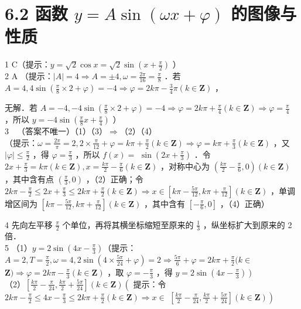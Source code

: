 \documentclass[10pt]{article}
\begin{document}
\section*{6.2 函数 \(y=A \sin (\omega x+\varphi)\) 的图像与性质}
1 C（提示：\(y=\sqrt{2} \cos x=\sqrt{2} \sin \left(x+\frac{\pi}{2}\right)\) ）\\
2 A （提示：\(|A|=4 \Rightarrow A= \pm 4, \omega=\frac{2 \pi}{16}=\frac{\pi}{8}\) ．若 \(A=4,4 \sin \left(\frac{\pi}{8} \times 2+\varphi\right)=-4 \Rightarrow \varphi=2 k \pi-\frac{3}{4} \pi(k \in \mathbf{Z})\) ，

无解．若 \(A=-4,-4 \sin \left(\frac{\pi}{8} \times 2+\varphi\right)=-4 \Rightarrow \varphi=2 k \pi+\frac{\pi}{4}(k \in \mathbf{Z}) \Rightarrow \varphi=\frac{\pi}{4}\) ，所以 \(y=-4 \sin \left(\frac{\pi}{8} x+\frac{\pi}{4}\right)\) ）\\
\(3 \quad\)（答案不唯一）（1）（3）\(\Rightarrow\)（2）（4）\\
（提示：\(\omega=\frac{2 \pi}{\pi}=2,2 \times \frac{\pi}{12}+\varphi=k \pi+\frac{\pi}{2}(k \in \mathbf{Z}) \Rightarrow \varphi=k \pi+\frac{\pi}{3}(k \in \mathbf{Z})\) ，又 \(|\varphi| \leqslant \frac{\pi}{2}\) ，得 \(\varphi=\frac{\pi}{3}\) ，所以 \(f(x)=\) \(\sin \left(2 x+\frac{\pi}{3}\right)\) ．令 \(2 x+\frac{\pi}{3}=k \pi(k \in \mathbf{Z}), x=\frac{k \pi}{2}-\frac{\pi}{6}(k \in \mathbf{Z})\) ，对称中心为 \(\left(\frac{k \pi}{2}-\frac{\pi}{6}, 0\right)(k \in \mathbf{Z})\) ，其中含有点 \(\left(\frac{\pi}{3}, 0\right)\) ，（2）正确；令 \(2 k \pi-\frac{\pi}{2} \leqslant 2 x+\frac{\pi}{3} \leqslant 2 k \pi+\frac{\pi}{2}(k \in \mathbf{Z}) \Rightarrow x \in\left[k \pi-\frac{5 \pi}{12}, k \pi+\frac{\pi}{12}\right](k \in \mathbf{Z})\) ，单调增区间为 \(\left[k \pi-\frac{5 \pi}{12}, k \pi+\frac{\pi}{12}\right](k \in \mathbf{Z})\) ，其中含有 \(\left[-\frac{\pi}{6}, 0\right]\) ，（4）正确）

4 先向左平移 \(\frac{\pi}{2}\) 个单位，再将其横坐标缩短至原来的 \(\frac{1}{3}\) ，纵坐标扩大到原来的 2 倍．\\
5 （1）\(y=2 \sin \left(4 x-\frac{\pi}{3}\right)\)（提示：\(A=2, T=\frac{\pi}{2}, \omega=4,2 \sin \left(4 \times \frac{5 \pi}{24}+\varphi\right)=2 \Rightarrow \frac{5 \pi}{6}+\varphi=2 k \pi+\frac{\pi}{2}(k \in\) \(\mathbf{Z}) \Rightarrow \varphi=2 k \pi-\frac{\pi}{3}(k \in \mathbf{Z})\) ，取 \(\varphi=-\frac{\pi}{3}\) ，得 \(\left.y=2 \sin \left(4 x-\frac{\pi}{3}\right)\right)\)\\
（2）\(\left[\frac{k \pi}{2}-\frac{\pi}{24}, \frac{k \pi}{2}+\frac{5 \pi}{24}\right](k \in \mathbf{Z})\left(\right.\) 提示：令 \(2 k \pi-\frac{\pi}{2} \leqslant 4 x-\frac{\pi}{3} \leqslant 2 k \pi+\frac{\pi}{2}(k \in \mathbf{Z}) \Rightarrow x \in\) \(\left.\left[\frac{k \pi}{2}-\frac{\pi}{24}, \frac{k \pi}{2}+\frac{5 \pi}{24}\right](k \in \mathbf{Z})\right)\)
\end{document}
